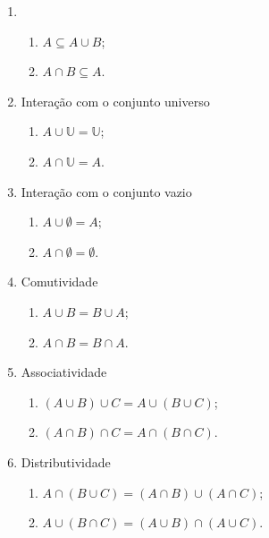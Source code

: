 \documentclass{article}
\begin{document}
\begin{enumerate}
    \item  
    \begin{enumerate}
        \item $A \subseteq A \cup B$;
        \item $A \cap B \subseteq A$.
    \end{enumerate}
    \item Interação com o conjunto universo
    \begin{enumerate}
        \item $A \cup \mathbb{U} = \mathbb{U}$;
        \item $A \cap \mathbb{U} = A$.
    \end{enumerate}
    \item Interação com o conjunto vazio
    \begin{enumerate}
        \item $A \cup \emptyset = A$;
        \item $A \cap \emptyset = \emptyset$.
    \end{enumerate}
    \item Comutividade
    \begin{enumerate}
        \item $A \cup B = B \cup A$;
        \item $A \cap B = B \cap A$.
    \end{enumerate}
    \item Associatividade
    \begin{enumerate}
        \item $(A \cup B) \cup C = A \cup (B \cup C)$;
        \item $(A \cap B) \cap C = A \cap (B \cap C)$.
    \end{enumerate}
    \item Distributividade
    \begin{enumerate}
        \item $A \cap (B \cup C) = (A \cap B) \cup (A \cap C)$;
        \item $A \cup (B \cap C) = (A \cup B) \cap (A \cup C)$.
    \end{enumerate}
\end{enumerate}
\end{document}
